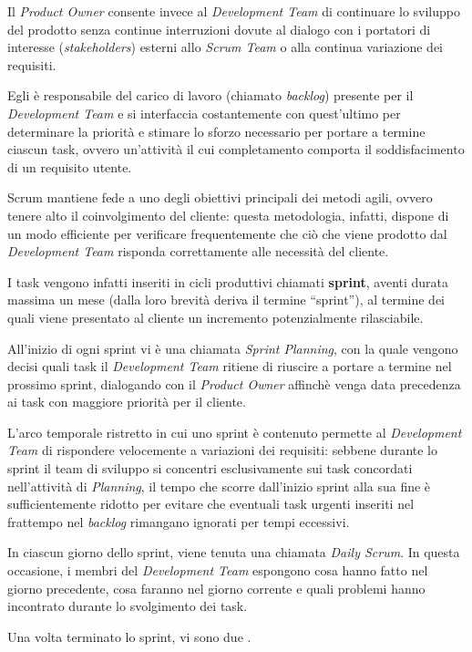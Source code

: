 Il \emph{Product Owner} consente invece al \emph{Development Team} di
continuare lo sviluppo del prodotto senza continue interruzioni dovute
al dialogo con i portatori di interesse (\emph{stakeholders}) esterni allo
\emph{Scrum Team} o alla continua variazione dei requisiti.

Egli è responsabile del carico di lavoro (chiamato \emph{backlog}) presente per
il \emph{Development Team} e si interfaccia costantemente con quest'ultimo per
determinare la priorità e stimare lo sforzo necessario per portare a termine
ciascun task, ovvero un'attività il cui completamento comporta il
soddisfacimento di un requisito utente.

Scrum mantiene fede a uno degli obiettivi principali dei metodi agili, ovvero
tenere alto il coinvolgimento del cliente: questa metodologia, infatti, dispone
di un modo efficiente per verificare frequentemente che ciò che viene prodotto
dal \emph{Development Team} risponda correttamente alle necessità del cliente.

I task vengono infatti inseriti in cicli produttivi chiamati \textbf{sprint},
aventi durata massima un mese (dalla loro brevità deriva il termine
``sprint''), al termine dei quali viene presentato al cliente un incremento
potenzialmente rilasciabile.

All'inizio di ogni sprint vi è una  chiamata \emph{Sprint
Planning}, con la quale vengono decisi quali task il \emph{Development Team}
ritiene di riuscire a portare a termine nel prossimo sprint, dialogando con il
\emph{Product Owner} affinchè venga data precedenza ai task con maggiore
priorità per il cliente.

L'arco temporale ristretto in cui uno sprint è contenuto permette al
\emph{Development Team} di rispondere velocemente a variazioni dei requisiti:
sebbene durante lo sprint il team di sviluppo si concentri esclusivamente sui
task concordati nell'attività di \emph{Planning}, il tempo che scorre
dall'inizio sprint alla sua fine è sufficientemente ridotto per evitare che
eventuali task urgenti inseriti nel frattempo nel \emph{backlog} rimangano
ignorati per tempi eccessivi.

In ciascun giorno dello sprint, viene tenuta una  chiamata
\emph{Daily Scrum}. In questa occasione, i membri del \emph{Development Team}
espongono cosa hanno fatto nel giorno precedente, cosa faranno nel giorno
corrente e quali problemi hanno incontrato durante lo svolgimento dei task.

Una volta terminato lo sprint, vi sono due .

